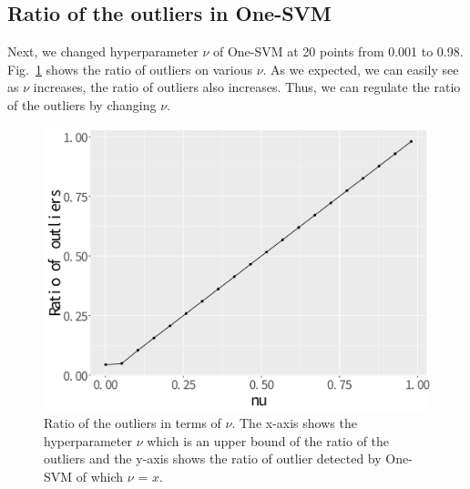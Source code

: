 \documentclass[dvipdfmx, english]{ampmt}             %
\newcommand{\Figref}[1]{Fig.~\ref{#1}}
\begin{document}
\subsection{Ratio of the outliers in One-SVM}
Next, we changed hyperparameter $\nu$ of One-SVM at 20 points from 0.001 to 0.98. \Figref{fig:nu} shows the ratio of outliers on various $\nu$.
As we expected, we can easily see as $\nu$ increases, the ratio of outliers also increases. Thus, we can regulate the ratio of the outliers by changing $\nu$.
\begin{figure}[H]
\centerline{\includegraphics[scale=0.32]{../img/ratio-of-outliers.pdf}}
\caption{Ratio of the outliers in terms of  $\nu$. The x-axis shows the hyperparameter $\nu$ which is an upper bound of the ratio of the outliers and the y-axis shows
the ratio of outlier detected by One-SVM of which $\nu$ = $x$.}
\label{fig:nu}
\end{figure}
\end{document}
